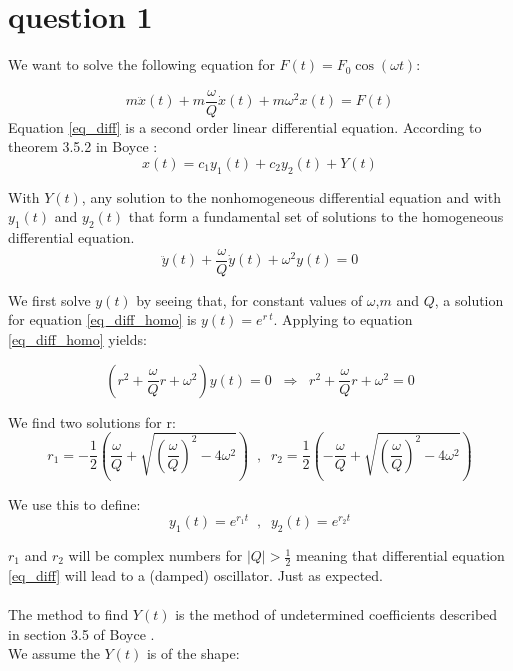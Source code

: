\section{question 1}

We want to solve the following equation for $F(t) = F_0 \cos(\omega t)$:

\begin{equation}
	m \ddot{x}(t) + m \frac{\omega}{Q} \dot{x}(t) + m \omega^2 x(t) = F(t)
	\label{eq_diff}
\end{equation}
Equation \ref{eq_diff} is a second order linear differential equation. According to theorem 3.5.2 in Boyce \cite{Boyce}:
\begin{equation}
	x(t) = c_1 y_1(t) + c_2 y_2(t) + Y(t)
	\label{eq_x_1_emtpy}
\end{equation}

With $Y(t)$, any solution to the nonhomogeneous differential equation and with $y_1(t)$ and $y_2(t)$ that form a fundamental set of solutions to the homogeneous differential equation.
\begin{equation}
	\ddot{y}(t) + \frac{\omega}{Q} \dot{y}(t) + \omega^2 y(t) = 0
	\label{eq_diff_homo}
\end{equation}

We first solve $y(t)$ by seeing that, for constant values of $\omega$,$m$ and $Q$, a solution for equation \ref{eq_diff_homo} is  $y(t) = e^{r \: t}$. Applying to equation \ref{eq_diff_homo} yields:

\begin{equation}
	(r^2 + \frac{\omega}{Q} r + \omega^2) y(t) = 0 \; \; \Rightarrow \; \; r^2 + \frac{\omega}{Q} r + \omega^2 = 0
	\label{eq_characteristic}
\end{equation}

We find two solutions for r:
\begin{equation*}
	r_1 = - \frac{1}{2} \left( \frac{\omega}{Q} + \sqrt{\left( \frac{\omega}{Q} \right)^2 -4 \omega^2} \right) \; \; , \; \; r_2 = \frac{1}{2} \left( -\frac{\omega}{Q} + \sqrt{\left( \frac{\omega}{Q} \right)^2 -4 \omega^2} \right)
\end{equation*}

We use this to define:
\begin{equation*}
	y_1(t) = e^{r_1 t} \; \; , \; \; y_2(t) = e^{r_2 t}
\end{equation*}

$r_1$ and $r_2$ will be complex numbers for $\mid Q \mid > \frac{1}{2}$ meaning that differential equation \ref{eq_diff} will lead to a (damped) oscillator. Just as expected.\\
\\
The method to find $Y(t)$ is the method of undetermined coefficients described in section 3.5 of Boyce \cite{Boyce}.\\
We assume the $Y(t)$ is of the shape:

